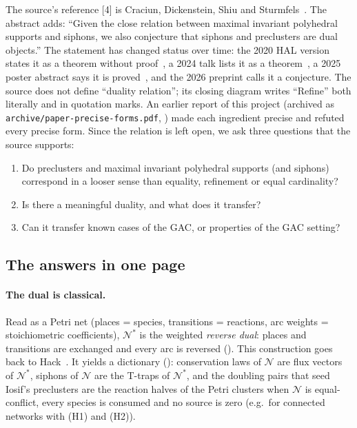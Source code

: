 \documentclass[11pt,a4paper]{report}
\newcommand{\Net}{\mathcal{N}}
\newcommand{\Nd}{\mathcal{N}^{*}}
\begin{document}
The source's reference [4] is Craciun, Dickenstein, Shiu and Sturmfels~\autocite{CDSS2009}. The abstract adds: ``Given the close
relation between maximal invariant polyhedral supports and siphons, we also conjecture that siphons and preclusters
are dual objects.'' The statement has changed status over time: the 2020 HAL version states it as a theorem without
proof~\autocite{Iosif2020}, a 2024 talk lists it as a theorem~\autocite{Iosif2024talk}, a 2025 poster abstract says it is
proved~\autocite{IosifAnaniadi2025}, and the 2026 preprint calls it a conjecture. The source does not define ``duality relation''; its closing diagram writes ``Refine'' both
literally and in quotation marks. An earlier report of this project (archived as
\texttt{archive/paper-precise-forms.pdf}, \autocite{ArchivedReport}) made each ingredient precise and refuted every
precise form. Since the relation is left open, we ask three questions that the source supports:
\begin{enumerate}
\item[Q1.] Do preclusters and maximal invariant polyhedral supports (and siphons) correspond in a looser sense than
equality, refinement or equal cardinality?
\item[Q2.] Is there a meaningful duality, and what does it transfer?
\item[Q3.] Can it transfer known cases of the GAC, or properties of the GAC setting?
\end{enumerate}

\subsection{The answers in one page}

\paragraph{The dual is classical.} Read as a Petri net (places = species, transitions = reactions, arc weights =
stoichiometric coefficients), \(\Nd\) is the weighted \emph{reverse dual}: places and transitions are exchanged and
every arc is reversed (). This construction goes back to Hack~\autocite{Hack1972}. It yields a
dictionary (): conservation laws of \(\Net\) are flux vectors of \(\Nd\), siphons of \(\Net\)
are the T-traps of \(\Nd\), and the doubling pairs that seed Iosif's preclusters are the reaction halves of the
Petri clusters when \(\Net\) is equal-conflict, every species is consumed and no source is zero (e.g.\ for connected
networks with (H1) and (H2)).
\end{document}
